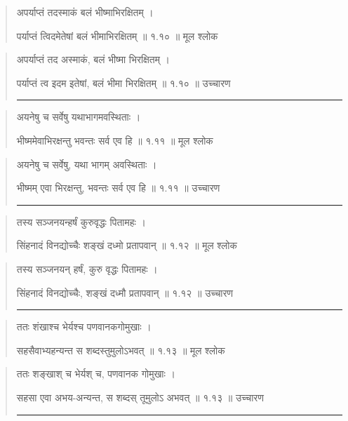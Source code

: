 \begin{quotation} 

अपर्याप्तं तदस्माकं बलं भीष्माभिरक्षितम्‌  ।  

पर्याप्तं त्विदमेतेषां बलं भीमाभिरक्षितम्‌  ॥ १.१० ॥  मूल श्लोक
\end{quotation}

\begin{quotation}

अपर्याप्तं तद अस्माकं, बलं भीष्मा भिरक्षितम्  ।  

पर्याप्तं त्व इदम इतेषां, बलं भीमा भिरक्षितम्  ॥ १.१० ॥  उच्चारण

\noindent\rule{16cm}{0.4pt} 
\end{quotation}


\begin{quotation} 
अयनेषु च सर्वेषु यथाभागमवस्थिताः  ।  

भीष्ममेवाभिरक्षन्तु भवन्तः सर्व एव हि  ॥ १.११ ॥  मूल श्लोक
\end{quotation}

\begin{quotation}

अयनेषु च सर्वेषु, यथा भागम् अवस्थिताः  ।  

भीष्मम् एवा भिरक्षन्तु, भवन्तः सर्व एव हि  ॥ १.११ ॥  उच्चारण

\noindent\rule{16cm}{0.4pt} 
\end{quotation}


\begin{quotation} 

तस्य सञ्जनयन्हर्षं कुरुवृद्धः पितामहः  ।  

सिंहनादं विनद्योच्चैः शङ्खं दध्मो प्रतापवान्‌   ॥ १.१२ ॥  मूल श्लोक
\end{quotation}

\begin{quotation}

तस्य सञ्जनयन् हर्षं, कुरु वृद्धः पितामहः  ।  

सिंहनादं विनद्योच्चैः, शङ्खं दध्मौ प्रतापवान्  ॥ १.१२ ॥  उच्चारण

\noindent\rule{16cm}{0.4pt} 
\end{quotation}


\begin{quotation} 

ततः शंखाश्च भेर्यश्च पणवानकगोमुखाः  ।  

सहसैवाभ्यहन्यन्त स शब्दस्तुमुलोऽभवत्‌  ॥ १.१३ ॥  मूल श्लोक
\end{quotation}

\begin{quotation}

ततः शङ्खाश् च भेर्यश् च, पणवानक गोमुखाः  ।  

सहसा एवा अभय-अन्यन्त, स शब्दस् तूमुलोऽ अभवत्  ॥ १.१३ ॥  उच्चारण

\noindent\rule{16cm}{0.4pt} 
\end{quotation}



